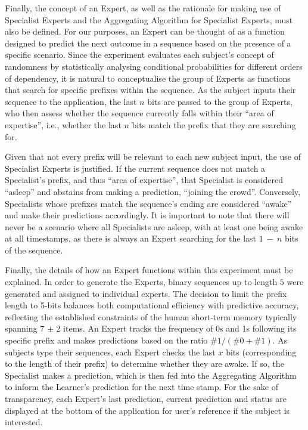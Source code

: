 Finally, the concept of an Expert, as well as the rationale for making use of Specialist Experts and the Aggregating Algorithm for Specialist Experts, must also be defined. For our purposes, an Expert can be thought of as a function designed to predict the next outcome in a sequence based on the presence of a specific scenario. Since the experiment evaluates each subject's concept of randomness by statistically analysing conditional probabilities for different orders of dependency, it is natural to conceptualise the group of Experts as functions that search for specific prefixes within the sequence. As the subject inputs their sequence to the application, the last $n$ bits are passed to the group of Experts, who then assess whether the sequence currently falls within their ``area of expertise'', i.e., whether the last $n$ bits match the prefix that they are searching for.

Given that not every prefix will be relevant to each new subject input, the use of Specialist Experts is justified. If the current sequence does not match a Specialist's prefix, and thus ``area of expertise'', that Specialist is considered ``asleep'' and abstains from making a prediction, ``joining the crowd''. Conversely, Specialists whose prefixes match the sequence's ending are considered ``awake'' and make their predictions accordingly. It is important to note that there will never be a scenario where all Specialists are asleep, with at least one being awake at all timestamps, as there is always an Expert searching for the last $1\ -\ n$ bits of the sequence.

Finally, the details of how an Expert functions within this experiment must be explained. In order to generate the Experts, binary sequences up to length $5$ were generated and assigned to individual experts. The decision to limit the prefix length to 5-bits balances both computational efficiency with predictive accuracy, reflecting the established constraints of the human short-term memory typically spanning 7 $\pm$ 2 items. An Expert tracks the frequency of 0s and 1s following its specific prefix and makes predictions based on the ratio $\#1 / (\#0 + \#1)$. As subjects type their sequences, each Expert checks the last $x$ bits (corresponding to the length of their prefix) to determine whether they are awake. If so, the Specialist makes a prediction, which is then fed into the Aggregating Algorithm to inform the Learner's prediction for the next time stamp. For the sake of transparency, each Expert's last prediction, current prediction and status are displayed at the bottom of the application for user's reference if the subject is interested.

